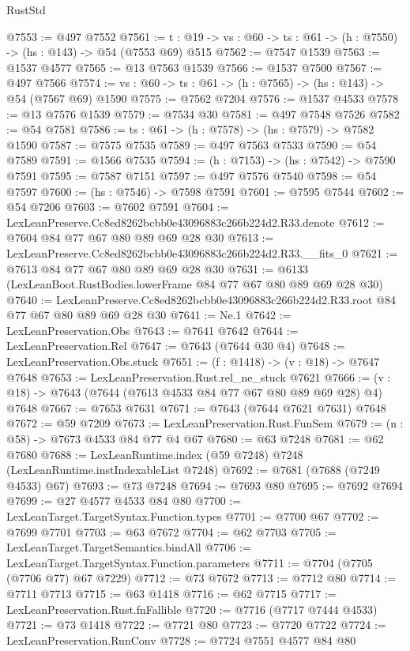 \begin{lexlean}{RustStd}
\begin{coremodule}
@7553 := @497 @7552
@7561 := {t : @19} -> {vs : @60} -> {ts : @61} -> (h : @7550) -> (hs : @143) -> @54 (@7553 @69) @515
@7562 := @7547 @1539
@7563 := @1537 @4577
@7565 := @13 @7563 @1539
@7566 := @1537 @7500
@7567 := @497 @7566
@7574 := {vs : @60} -> {ts : @61} -> (h : @7565) -> (hs : @143) -> @54 (@7567 @69) @1590
@7575 := @7562 @7204
@7576 := @1537 @4533
@7578 := @13 @7576 @1539
@7579 := @7534 @30
@7581 := @497 @7548 @7526
@7582 := @54 @7581
@7586 := {ts : @61} -> (h : @7578) -> (hs : @7579) -> @7582 @1590
@7587 := @7575 @7535
@7589 := @497 @7563 @7533
@7590 := @54 @7589
@7591 := @1566 @7535
@7594 := (h : @7153) -> (hs : @7542) -> @7590 @7591
@7595 := @7587 @7151
@7597 := @497 @7576 @7540
@7598 := @54 @7597
@7600 := (hs : @7546) -> @7598 @7591
@7601 := @7595 @7544
@7602 := @54 @7206
@7603 := @7602 @7591
@7604 := LexLeanPreserve.Cc8ed8262bcbb0e43096883c266b224d2.R33.denote
@7612 := @7604 @84 @77 @67 @80 @89 @69 @28 @30
@7613 := LexLeanPreserve.Cc8ed8262bcbb0e43096883c266b224d2.R33.__fits_0
@7621 := @7613 @84 @77 @67 @80 @89 @69 @28 @30
@7631 := @6133 (LexLeanBoot.RustBodies.lowerFrame @84 @77 @67 @80 @89 @69 @28 @30)
@7640 := LexLeanPreserve.Cc8ed8262bcbb0e43096883c266b224d2.R33.root @84 @77 @67 @80 @89 @69 @28 @30
@7641 := Ne.{1}
@7642 := LexLeanPreservation.Obs
@7643 := @7641 @7642
@7644 := LexLeanPreservation.Rel
@7647 := @7643 (@7644 @30 @4)
@7648 := LexLeanPreservation.Obs.stuck
@7651 := (f : @1418) -> (v : @18) -> @7647 @7648
@7653 := LexLeanPreservation.Rust.rel_ne_stuck @7621
@7666 := (v : @18) -> @7643 (@7644 (@7613 @4533 @84 @77 @67 @80 @89 @69 @28) @4) @7648
@7667 := @7653 @7631
@7671 := @7643 (@7644 @7621 @7631) @7648
@7672 := @59 @7209
@7673 := LexLeanPreservation.Rust.FunSem
@7679 := (n : @58) -> @7673 @4533 @84 @77 @4 @67
@7680 := @63 @7248
@7681 := @62 @7680
@7688 := LexLeanRuntime.index (@59 @7248) @7248 (LexLeanRuntime.instIndexableList @7248)
@7692 := @7681 (@7688 (@7249 @4533) @67)
@7693 := @73 @7248
@7694 := @7693 @80
@7695 := @7692 @7694
@7699 := @27 @4577 @4533 @84 @80
@7700 := LexLeanTarget.TargetSyntax.Function.types
@7701 := @7700 @67
@7702 := @7699 @7701
@7703 := @63 @7672
@7704 := @62 @7703
@7705 := LexLeanTarget.TargetSemantics.bindAll
@7706 := LexLeanTarget.TargetSyntax.Function.parameters
@7711 := @7704 (@7705 (@7706 @77) @67 @7229)
@7712 := @73 @7672
@7713 := @7712 @80
@7714 := @7711 @7713
@7715 := @63 @1418
@7716 := @62 @7715
@7717 := LexLeanPreservation.Rust.fnFallible
@7720 := @7716 (@7717 @7444 @4533)
@7721 := @73 @1418
@7722 := @7721 @80
@7723 := @7720 @7722
@7724 := LexLeanPreservation.RunConv
@7728 := @7724 @7551 @4577 @84 @80

\end{coremodule}
\end{lexlean}
